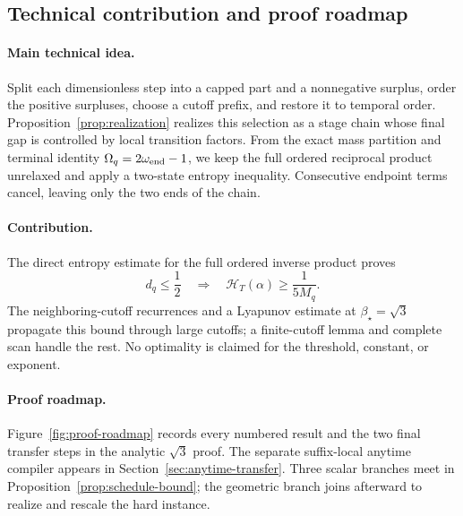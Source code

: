 \documentclass[11pt]{article}
\theoremstyle{definition}
\theoremstyle{remark}
\newcommand{\cert}{\mathcal{H}}
\newcommand{\rankmass}{M}
\newcommand{\rankdens}{d}
\newcommand{\criticalexp}{\beta_{\star}}
\begin{document}
\subsection{Technical contribution and proof roadmap}

\paragraph{Main technical idea.}
Split each dimensionless step into a capped part and a nonnegative surplus,
order the positive surpluses, choose a cutoff prefix, and restore it to
temporal order.  Proposition~\ref{prop:realization} realizes this selection
as a stage chain whose final gap is controlled by local transition factors.
From the exact mass partition and terminal identity
\(\Omega_q=2\omega_{\rm end}-1\), we keep the full ordered reciprocal product
unrelaxed and apply a two-state entropy inequality.  Consecutive endpoint
terms cancel, leaving only the two ends of the chain.

\paragraph{Contribution.}
The direct entropy estimate for the full ordered inverse product proves
\[
 \rankdens_q\le\frac12
 \quad\Longrightarrow\quad
 \cert_T(\alpha)\ge\frac1{5\rankmass_q}.
\]
The neighboring-cutoff recurrences and a Lyapunov estimate at
\(\criticalexp=\sqrt3\) propagate this bound through large cutoffs; a
finite-cutoff lemma and complete scan handle the rest.  No optimality is
claimed for the threshold, constant, or exponent.

\paragraph{Proof roadmap.}
Figure~\ref{fig:proof-roadmap} records every numbered result and the two final
transfer steps in the analytic \(\sqrt3\) proof.  The separate suffix-local
anytime compiler appears in Section~\ref{sec:anytime-transfer}.  Three scalar branches meet in
Proposition~\ref{prop:schedule-bound}; the geometric branch joins afterward
to realize and rescale the hard instance.
\end{document}

